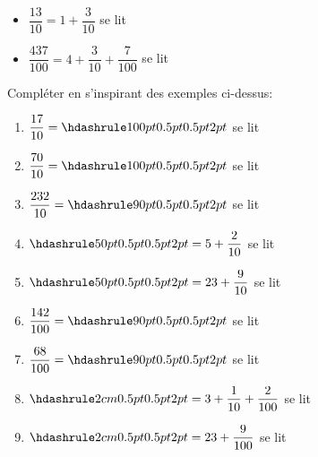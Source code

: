 \documentclass[activite]{thedocument}
\begin{document}
\begin{mdframed}
    \begin{itemize}[label=$\bullet$]
    \item$\dfrac{13}{10}=1+\dfrac{3}{10}$ se lit 
    \item$\dfrac{437}{100}=4+\dfrac{3}{10}+\dfrac{7}{100}$ se lit 
    \end{itemize}
\end{mdframed}
\vspace{0.5cm}
\def\x{5}
Compléter en s'inspirant des exemples ci-dessus:
\begin{enumerate}[label=(\alph*)]
    \item$\dfrac{17}{10}=\doted{100pt}$ se lit \guillemets{\doted{170pt}}
    \item$\dfrac{70}{10}=\doted{100pt}$ se lit \guillemets{\doted{171pt}}
    \item$\dfrac{232}{10}=\doted{90pt}$ se lit \guillemets{\doted{175pt}}
    \item$\doted{50pt}=5+\dfrac{2}{10}$ se lit \guillemets{\doted{200pt}}
    \item$\doted{50pt}=23+\dfrac{9}{10}$ se lit \guillemets{\doted{200pt}}
    \item$\dfrac{142}{100}=\doted{90pt}$ se lit \guillemets{\doted{175pt}}
    \item$\dfrac{68}{100}=\doted{90pt}$ se lit \guillemets{\doted{175pt}}
    \item$\doted{2cm}=3+\dfrac{1}{10}+\dfrac{2}{100}$ se lit \guillemets{\doted{5cm}}
    \item$\doted{2cm}=23+\dfrac{9}{100}$ se lit \guillemets{\doted{6cm}}
\end{enumerate}
\end{document}
